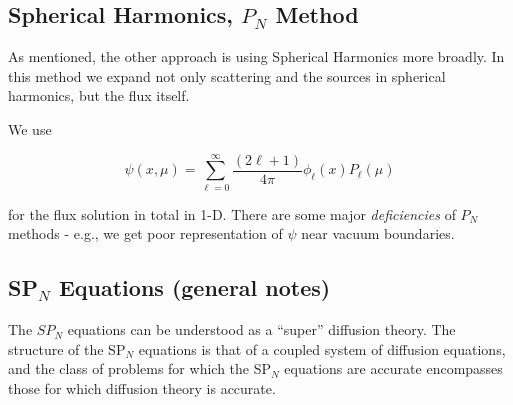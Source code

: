 \documentclass[12pt]{article}
\begin{document}
\subsection*{Spherical Harmonics, $P_N$ Method}

As mentioned, the other approach is using Spherical Harmonics more broadly. In 
this method we expand not only scattering and the sources in spherical 
harmonics, but the flux itself. 

We use

\[
\psi(x, \mu) = \sum_{\ell=0}^{\infty} \frac{(2\ell+1)}{4\pi} \phi_\ell(x)P_\ell(\mu)
\]

for the flux solution in total in 1-D. There are some major
\textit{deficiencies} of $P_N$ methods - e.g., we get poor representation of
$\psi$ near vacuum boundaries.

\subsection*{SP$_N$ Equations (general notes)}

The $SP_N$ equations can be understood as a ``super'' diffusion theory.
The structure of the SP$_N$ equations is that of a coupled system of diffusion equations, and the class of problems for which the SP$_N$ equations are accurate encompasses those for which diffusion theory is accurate.
\end{document}
